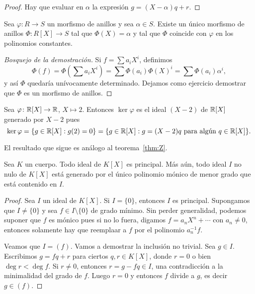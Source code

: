 \begin{proof}
Hay que evaluar en $\alpha$ la expresión $g=(X-\alpha)q+r$. 	
\end{proof}


\begin{proposition}
\label{pro:polinomios}
Sea $\varphi\colon R\to S$ un morfismo de anillos y sea $\alpha\in S$. Existe un único morfismo de anillos $\Phi\colon R[X]\to S$ 
tal que $\Phi(X)=\alpha$ y tal que $\Phi$ coincide con $\varphi$ en los polinomios constantes.  	
\end{proposition}

\begin{proof}[Bosquejo de la demostración]
Si $f=\sum a_iX^i$, definimos 
\[
\Phi(f)=\Phi(\sum a_iX^i)=\sum\Phi(a_i)\Phi(X)^i=\sum\Phi(a_i)\alpha^i,
\] 	
y así $\Phi$ quedaría unívocamente determinado. Dejamos como ejercicio demostrar que $\Phi$ es un morfismo de anillos. 
\end{proof}

\begin{example}
Sea $\varphi\colon\mathbb{R}[X]\to\mathbb{R}$, $X\mapsto 2$. Entonces $\ker\varphi$ es el ideal   
$(X-2)$ de $\mathbb{R}[X]$ generado por $X-2$ pues 
\[
\ker\varphi=\{g\in\mathbb{R}[X]:g(2)=0\}
=\{g\in\mathbb{R}[X]:g=(X-2)q\text{ para algún $q\in\mathbb{R}[X]$}\}.
\] 	
\end{example}

El resultado que sigue es análogo al teorema~\ref{thm:Z}.

\begin{theorem}
Sea $K$ un cuerpo. Todo ideal de $K[X]$ es principal. Más aún, todo ideal $I$ no nulo de $K[X]$
está generado por el único polinomio mónico de menor grado que está contenido en $I$.  	
\end{theorem}

\begin{proof}
	Sea $I$ un ideal de $K[X]$. Si $I=\{0\}$, entonces $I$ es principal. Supongamos que $I\ne\{0\}$ 
	y sea $f\in I\setminus\{0\}$ de grado mínimo. Sin perder generalidad, podemos suponer que $f$ es mónico pues
	si no lo fuera, digamos $f=a_nX^n+\cdots$ con $a_n\ne 0$, entonces solamente hay que reemplaar a $f$ 
	por el polinomio $a_n^{-1}f$. 
	
	Veamos que $I=(f)$. Vamos a demostrar la inclusión no trivial. Sea $g\in I$. Escribimos
	$g=fq+r$ para ciertos $q,r\in K[X]$, donde $r=0$ o bien $\deg r<\deg f$. Si $r\ne 0$, entonces $r=g-fq\in I$, 
	una contradicción a la minimalidad del grado de $f$. Luego $r=0$ y entonces $f$ divide a $g$, es decir
	$g\in (f)$.   
\end{proof}


